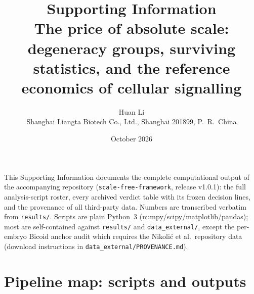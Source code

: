 \documentclass[11pt]{article}
\title{\bfseries Supporting Information\\[4pt]
\large The price of absolute scale: degeneracy groups, surviving\\
statistics, and the reference economics of cellular signalling}
\author{Huan Li\\ \small Shanghai Liangta Biotech Co., Ltd., Shanghai 201899, P.\ R.\ China}
\date{October 2026}
\begin{document}
\sloppy
\maketitle

\noindent This Supporting Information documents the complete computational
output of the accompanying repository (\texttt{scale-free-framework},
release v1.0.1): the full analysis-script roster, every archived verdict
table with its frozen decision lines, and the provenance of all
third-party data. Numbers are transcribed verbatim from
\texttt{results/}. Scripts are plain Python~3
(numpy/scipy/matplotlib/pandas); most are self-contained against
\texttt{results/} and \texttt{data\_external/}, except the per-embryo
Bicoid anchor audit which requires the Nikoli\'c et al.\ repository data
(download instructions in \texttt{data\_external/PROVENANCE.md}).

\tableofcontents
\newpage

\section{Pipeline map: scripts and outputs}
\end{document}
